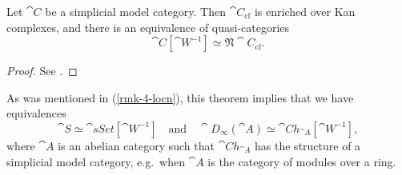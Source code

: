 \begin{theorem}
    Let $\cat{C}$ be a simplicial model category.
    Then $\cat{C}_{\mathrm{cf}}$ is enriched over Kan complexes,
    and there is an equivalence of quasi-categories 
    \[ \cat{C}[\cat{W}^{-1}] \simeq \mathfrak{N}\cat{C}_{\mathrm{cf}}. \]
\end{theorem}

\begin{proof}
    See \cite[Theorem~1.3.4.20]{ha}.
\end{proof}

\begin{example}
    As was mentioned in (\ref{rmk-4-locn}),
    this theorem implies that we have equivalences
    \[ \cat S\simeq\cat{sSet}[\cat W^{-1}]\quad\text{and}\quad
    \cat D_\infty(\cat A)\simeq\cat{Ch}_{\cat A}[\cat W^{-1}], \]
    where $\cat{A}$ is an abelian category such that
    $\cat{Ch}_{\cat{A}}$ has the structure of a simplicial model category,
    e.g.\ when $\cat{A}$ is the category of modules over a ring.
    \varqed
\end{example}


